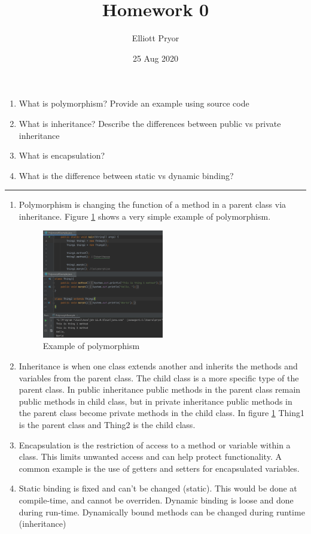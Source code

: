 \documentclass[11pt]{article}
\title{Homework 0}
\author{Elliott Pryor}
\date{25 Aug 2020}
\begin{document}
\maketitle

\begin{enumerate}[1.]
	\item What is polymorphism? Provide an example using source code
	\item What is inheritance? Describe the differences between public vs private inheritance
	\item What is encapsulation?
	\item What is the difference between static vs dynamic binding?
\end{enumerate}
\hrule

\begin{enumerate}[1.]
	\item Polymorphism is changing the function of a method in a parent class via inheritance. Figure \ref{fig:polymorph} shows a very simple example of polymorphism.	
	
	\begin{figure}[H]
	    \centering
	    \includegraphics[width=0.5\textwidth]{../pictures/polymorph.png}
	    \caption{Example of polymorphism}
	    \label{fig:polymorph}
	\end{figure}
	
	\item Inheritance is when one class extends another and inherits the methods and variables from the parent class. The child class is a more specific type of the parent class. In public inheritance public methods in the parent class remain public methods in child class, but in private inheritance public methods in the parent class become private methods in the child class. In figure \ref{fig:polymorph} Thing1 is the parent class and Thing2 is the child class.
	\item Encapsulation is the restriction of access to a method or variable within a class. This limits unwanted access and can help protect functionality. A common example is the use of getters and setters for encapsulated variables. 
	\item Static binding is fixed and can't be changed (static). This would be done at compile-time, and cannot be overriden. Dynamic binding is loose and done during run-time. Dynamically bound methods can be changed during runtime (inheritance) \cite{singh_2013}
\end{enumerate}
\end{document}
